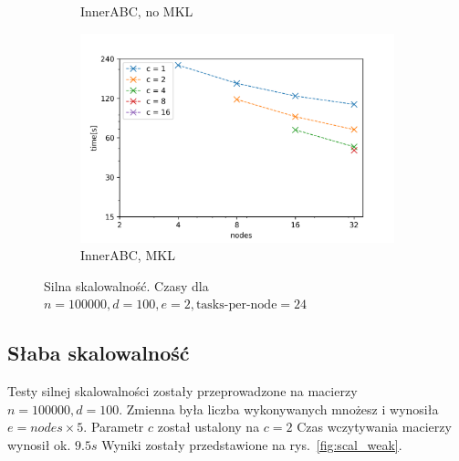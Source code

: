 \documentclass{article}
\begin{document}
\begin{figure}[ht!]
\begin{subfigure}[b]{0.45\textwidth}
        \caption{InnerABC, no MKL}
    \end{subfigure}
    \begin{subfigure}[b]{0.45\textwidth}
        \includegraphics[width=\textwidth]{charts/s_100000_100_2_i_m}
        \caption{InnerABC, MKL}
    \end{subfigure}
    \caption{Silna skalowalność. Czasy dla $n=100000, d=100, e=2, \text{tasks-per-node}=24$}\label{fig:animals}
    \label{fig:scal_strong_2}
\end{figure}

\subsection{Słaba skalowalność}

Testy silnej skalowalności zostały przeprowadzone na macierzy $n=100000, d=100$.
Zmienna była liczba wykonywanych mnożesz i wynosiła $e = nodes \times 5$.
Parametr $c$ został ustalony na $c=2$
Czas wczytywania macierzy wynosił ok. $9.5s$
Wyniki zostały przedstawione na rys.~\ref{fig:scal_weak}.
\end{document}
